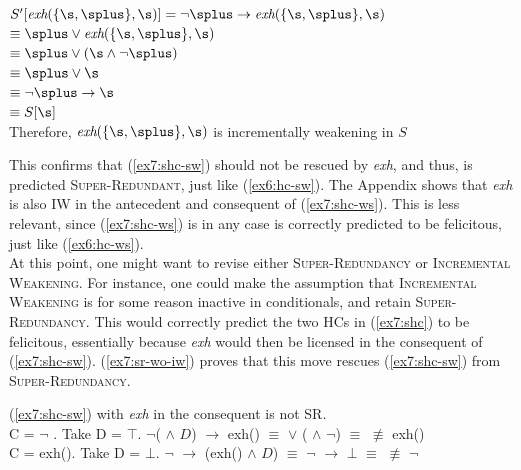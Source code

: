 \begin{exe}
{		$S'[\textit{exh}(\lbrace\s, \splus\rbrace, \s)] = \neg\splus \rightarrow \textit{exh}(\lbrace\s, \splus\rbrace, \s)$\\
		$\equiv \splus \vee \textit{exh}(\lbrace\s, \splus\rbrace, \s)$\\
		 $\equiv \splus \vee (\s\wedge\neg\splus)$\\
		 $\equiv \splus \vee\s$\\
		 $\equiv \neg\splus \rightarrow\s$\\
		 $\equiv S[\s]$\\
		Therefore, $\textit{exh}(\lbrace\s, \splus\rbrace, \s)$ is incrementally weakening in $S$}\label{ex7:iw-hc-sw-cons-m}
\end{exe}

This confirms that (\ref{ex7:shc-sw}) should not be rescued by \textit{exh}, and thus, is predicted \textsc{Super-Redundant}, just like (\ref{ex6:hc-sw}). The Appendix shows that \textit{exh} is also IW in the antecedent and consequent of (\ref{ex7:shc-ws}). This is less relevant, since (\ref{ex7:shc-ws}) is in any case is correctly predicted to be felicitous, just like (\ref{ex6:hc-ws}).\\


At this point, one might want to revise either \textsc{Super-Redundancy} or \textsc{Incremental Weakening}. For instance, one could make the assumption that \textsc{Incremental Weakening} is for some reason inactive in conditionals, and retain \textsc{Super-Redundancy}. This would correctly predict the two HCs in (\ref{ex7:shc}) to be felicitous, essentially because \textit{exh} would then be licensed in the consequent of (\ref{ex7:shc-sw}). (\ref{ex7:sr-wo-iw}) proves that this move rescues (\ref{ex7:shc-sw}) from \textsc{Super-Redundancy}.

\begin{exe}
	\ex\label{ex7:sr-wo-iw} {(\ref{ex7:shc-sw}) with \textit{exh} in the consequent is not SR.\\
		C = $\neg$ \splus. Take D = $\top$. $\neg$(\splus{} $\wedge$ $D$) $\rightarrow$ exh(\s) $\equiv$ \splus{} $\vee$ (\s{} $\wedge$ $\neg$\splus) $\equiv$ \s{} $\not\equiv$ exh(\s)\\
		C = exh(\s). Take D = $\bot$. $\neg$\splus{} $\rightarrow$ (exh(\s) $\wedge$ $D$) $\equiv$ $\neg$\splus{} $\rightarrow$ $\bot$ $\equiv$ \splus{} $\not\equiv$ $\neg$\splus}
\end{exe}

